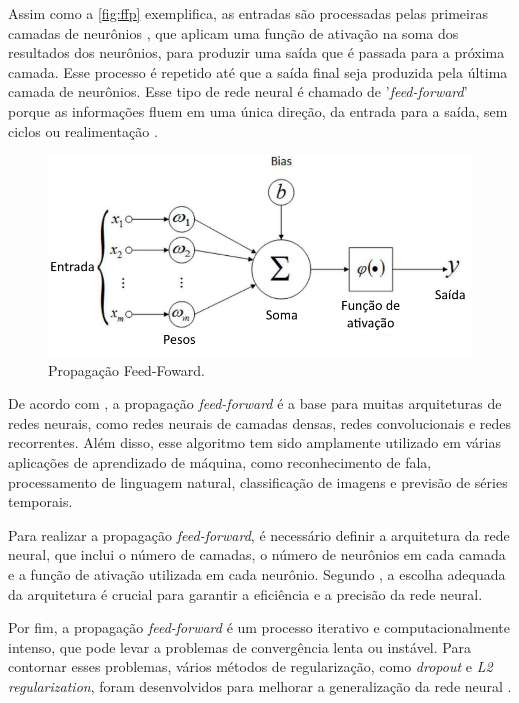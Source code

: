 Assim como a \autoref{fig:ffp} exemplifica, as entradas %
são processadas pelas primeiras camadas de neurônios %
, que aplicam uma função de ativação na soma dos resultados dos neurônios, para produzir uma saída que é passada para a próxima camada. 
Esse processo é repetido até que a saída final seja produzida pela última camada de neurônios. 
Esse tipo de rede neural é chamado de '\textit{feed-forward}' porque as informações fluem em uma única direção, da entrada para a saída, sem ciclos ou realimentação \cite{Goodfellow2016}.

\begin{figure}[htb]
    \centering
    \includegraphics[width=1\linewidth]{TCC UFG/images/aannbias.jpeg}
    \caption{Propagação Feed-Foward.}
    \label{fig:ffp}
\end{figure}

De acordo com , a propagação \textit{feed-forward} é a base para muitas arquiteturas de redes neurais, como redes neurais de camadas densas, redes convolucionais e redes recorrentes. 
Além disso, esse algoritmo tem sido amplamente utilizado em várias aplicações de aprendizado de máquina, como reconhecimento de fala, processamento de linguagem natural, classificação de imagens e previsão de séries temporais.

Para realizar a propagação \textit{feed-forward}, é necessário definir a arquitetura da rede neural, que inclui o número de camadas, o número de neurônios em cada camada e a função de ativação utilizada em cada neurônio. 
Segundo , a escolha adequada da arquitetura é crucial para garantir a eficiência e a precisão da rede neural.

Por fim, a propagação \textit{feed-forward} é um processo iterativo e computacionalmente intenso, que pode levar a problemas de convergência lenta ou instável. 
Para contornar esses problemas, vários métodos de regularização, como \textit{dropout} e \textit{L2 regularization}, foram desenvolvidos para melhorar a generalização da rede neural \cite{srivastava2014}.

